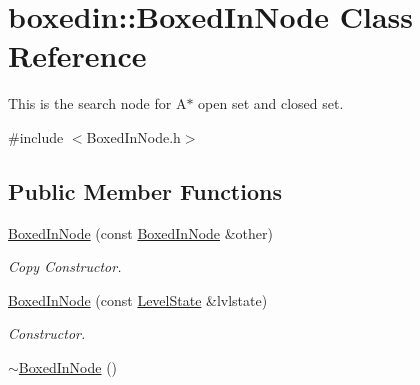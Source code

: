 \hypertarget{classboxedin_1_1BoxedInNode}{\section{boxedin\+:\+:Boxed\+In\+Node Class Reference}
\label{classboxedin_1_1BoxedInNode}
}


This is the search node for A$\ast$ open set and closed set.  




{\ttfamily \#include $<$Boxed\+In\+Node.\+h$>$}

\subsection*{Public Member Functions}
\begin{DoxyCompactItemize}
\item 
\hyperlink{classboxedin_1_1BoxedInNode_aa13a2c9cd03950af305a720a1a5c2e84}{Boxed\+In\+Node} (const \hyperlink{classboxedin_1_1BoxedInNode}{Boxed\+In\+Node} \&other)
\begin{DoxyCompactList}\small\item\em Copy Constructor. \end{DoxyCompactList}\item 
\hyperlink{classboxedin_1_1BoxedInNode_ab014fcdfc32785894ec87d26111a8f7b}{Boxed\+In\+Node} (const \hyperlink{classboxedin_1_1LevelState}{Level\+State} \&lvlstate)
\begin{DoxyCompactList}\small\item\em Constructor. \end{DoxyCompactList}\item 
\hypertarget{classboxedin_1_1BoxedInNode_a234011906b0a2a0b30807bb0a434bce3}{\hyperlink{classboxedin_1_1BoxedInNode_a234011906b0a2a0b30807bb0a434bce3}{$\sim$\+Boxed\+In\+Node} ()}\label{classboxedin_1_1BoxedInNode_a234011906b0a2a0b30807bb0a434bce3}


\end{DoxyCompactItemize}
